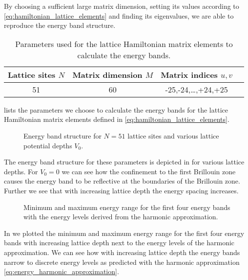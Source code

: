 By choosing a sufficient large matrix dimension, setting its values according
to \cref{eq:hamiltonian_lattice_elements} and finding its eigenvalues, we
are able to reproduce the energy band structure.
\begin{table}[htb]
  \centering
  \begin{tabular}{cccc}
    \toprule
    Lattice sites $N$ & Matrix dimension $M$ & Matrix indices $u,v$ \\
    \midrule
    51 & 60 & -25,-24,\dots,+24,+25 \\
    \bottomrule
  \end{tabular}
  \caption{Parameters used for the lattice Hamiltonian matrix elements to
    calculate the energy bands.
  }\label{tab:hamiltonian_elements}
\end{table}
 lists the parameters we choose to calculate
the energy bands for the lattice Hamiltonian matrix elements defined in
\cref{eq:hamiltonian_lattice_elements}.
\begin{figure}[htb]
  \centering
  \begin{adjustbox}{width=\textwidth}
    
  \end{adjustbox}
  \caption{Energy band structure for $N=51$ lattice sites and various lattice
    potential depths $V_0$.
  }\label{fig:scale_energy_structure}
\end{figure}
The energy band structure for these parameters is depicted in
 for various lattice depths. For $V_0=0$ we
can see how the confinement to the first Brillouin zone causes the energy band
to be reflective at the boundaries of the Brillouin zone. Further we see that
with increasing lattice depth the energy spacing increases.
\begin{figure}[htb]
  \centering
  \begin{adjustbox}{width=\textwidth}
    
  \end{adjustbox}
  \caption{Minimum and maximum energy range for the first four energy bands
    with the energy levels derived from the harmonic approximation.
  }\label{fig:scale_energy}
\end{figure}
In  we plotted the minimum and maximum energy range
for the first four energy bands with increasing lattice depth next to the
energy levels of the harmonic approximation. We can see how with increasing
lattice depth the energy bands narrow to discrete energy levels as predicted
with the harmonic approximation \cref{eq:energy_harmonic_approximation}.

